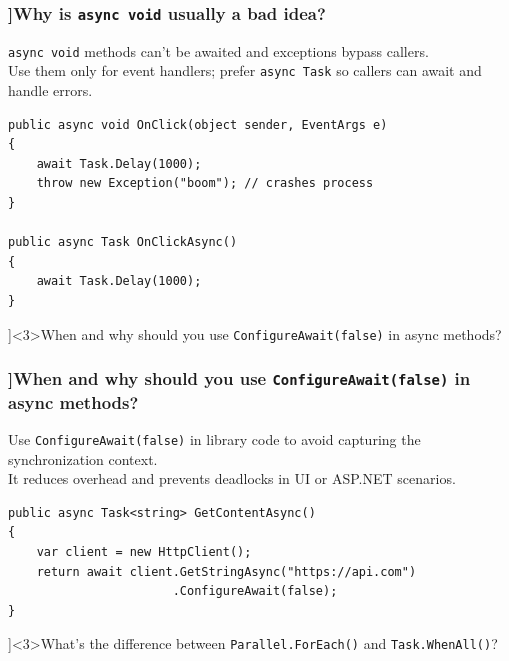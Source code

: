 \begin{frame}[fragile]
  \frametitle{\AnswerTitle[\CategoryBadge[OOPColor!20]{C\#} ]{Why is \texttt{async void} usually a bad idea?}}

  {\footnotesize
  \texttt{async void} methods can't be awaited and exceptions bypass callers.\\
  Use them only for event handlers; prefer \texttt{async Task} so callers can await and handle errors.
  }

  \begin{verbatim}
public async void OnClick(object sender, EventArgs e)
{
    await Task.Delay(1000);
    throw new Exception("boom"); // crashes process
}

public async Task OnClickAsync()
{
    await Task.Delay(1000);
}
  \end{verbatim}
\end{frame}

\QuestionSlide[\CategoryBadge[PerfColor!20]{Async \& Threading}]<3>{When and why should you use \texttt{ConfigureAwait(false)} in async methods?}

\begin{frame}[fragile]
  \frametitle{\AnswerTitle[\CategoryBadge[OOPColor!20]{C\#} ]{When and why should you use \texttt{ConfigureAwait(false)} in async methods?}}

  {\footnotesize
  Use \texttt{ConfigureAwait(false)} in library code to avoid capturing the synchronization context.\\
  It reduces overhead and prevents deadlocks in UI or ASP.NET scenarios.
  }

  \begin{verbatim}
public async Task<string> GetContentAsync()
{
    var client = new HttpClient();
    return await client.GetStringAsync("https://api.com")
                       .ConfigureAwait(false);
}
  \end{verbatim}
\end{frame}

\QuestionSlide[\CategoryBadge[PerfColor!20]{Async \& Threading}]<3>{What's the difference between \texttt{Parallel.ForEach()} and \texttt{Task.WhenAll()}?}


